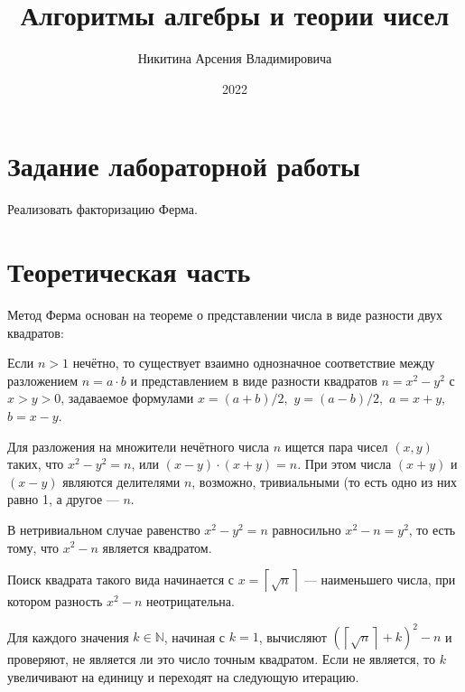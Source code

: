 \documentclass[bachelor, och, labwork]{shiza}
\begin{document}
\title{Алгоритмы алгебры и теории чисел}





\author{Никитина Арсения Владимировича}




\date{2022}

\maketitle



\tableofcontents

\section{Задание лабораторной работы}

Реализовать факторизацию Ферма.

\section{Теоретическая часть}

Метод Ферма основан на теореме о представлении числа в виде разности двух квадратов:

Если $n>1$ нечётно, то существует взаимно однозначное соответствие между разложением 
$n=a\cdot b$ и представлением в виде разности квадратов $n=x^{2}-y^{2}$ с $x>y>0$,
задаваемое формулами $x=(a+b)/2,$ $y=(a-b)/2,$ $a=x+y$, $b=x-y.$

Для разложения на множители нечётного числа $n$ ищется пара чисел $(x,y)$ таких, 
что $x^2 - y^2 = n$, или $(x-y)\cdot (x+y)=n$. При этом числа $(x+y)$ и $(x-y)$ 
являются делителями $n$, возможно, тривиальными (то есть одно из них равно 1, а 
другое --- $n$.

В нетривиальном случае равенство $x^2 - y^2 = n$ равносильно $x^{2}-n=y^{2}$, 
то есть тому, что $x^{2}-n$ является квадратом.

Поиск квадрата такого вида начинается с $x=\left\lceil {\sqrt {n}}\right\rceil$ --- 
наименьшего числа, при котором разность $x^{2}-n$ неотрицательна.

Для каждого значения $k\in \mathbb  {N}$, начиная с $k=1$, вычисляют 
$\left(\left\lceil {\sqrt {n}}\right\rceil +k\right)^{2}-n$ и проверяют, не 
является ли это число точным квадратом. Если не является, то $k$ увеличивают на 
единицу и переходят на следующую итерацию.
\end{document}
